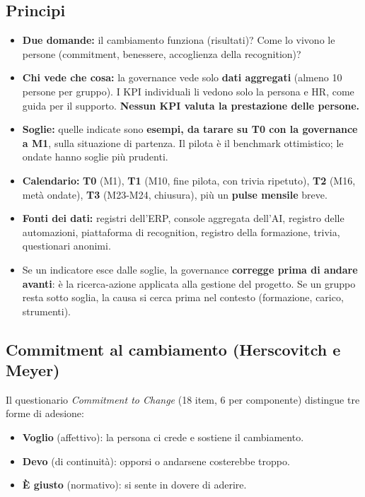 \documentclass[11pt,a4paper]{article}
\begin{document}
\subsection{Principi}\label{sec:16.1}
\begin{itemize}
\item \textbf{Due domande:} il cambiamento funziona (risultati)? Come lo vivono le persone (commitment, benessere, accoglienza della recognition)?
\item \textbf{Chi vede che cosa:} la governance vede solo \textbf{dati aggregati} (almeno 10 persone per gruppo). I KPI individuali li vedono solo la persona e HR, come guida per il supporto. \textbf{Nessun KPI valuta la prestazione delle persone.}
\item \textbf{Soglie:} quelle indicate sono \textbf{esempi, da tarare su T0 con la governance a M1}, sulla situazione di partenza. Il pilota è il benchmark ottimistico; le ondate hanno soglie più prudenti.
\item \textbf{Calendario:} \textbf{T0} (M1), \textbf{T1} (M10, fine pilota, con trivia ripetuto), \textbf{T2} (M16, metà ondate), \textbf{T3} (M23-M24, chiusura), più un \textbf{pulse mensile} breve.
\item \textbf{Fonti dei dati:} registri dell'ERP, console aggregata dell'AI, registro delle automazioni, piattaforma di recognition, registro della formazione, trivia, questionari anonimi.
\item Se un indicatore esce dalle soglie, la governance \textbf{corregge prima di andare avanti}: è la ricerca-azione applicata alla gestione del progetto. Se un gruppo resta sotto soglia, la causa si cerca prima nel contesto (formazione, carico, strumenti).
\end{itemize}

\subsection{Commitment al cambiamento (Herscovitch e Meyer)}\label{sec:16.2}
Il questionario \emph{Commitment to Change} (18 item, 6 per componente) distingue tre forme di adesione:
\begin{itemize}
\item \textbf{\guillemotleft{}Voglio\guillemotright{}} (affettivo): la persona ci crede e sostiene il cambiamento.
\item \textbf{\guillemotleft{}Devo\guillemotright{}} (di continuità): opporsi o andarsene costerebbe troppo.
\item \textbf{\guillemotleft{}È giusto\guillemotright{}} (normativo): si sente in dovere di aderire.
\end{itemize}
\end{document}
